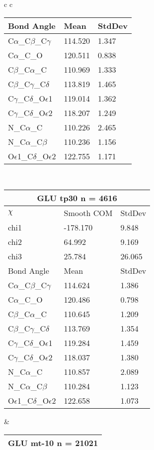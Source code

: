 \begin{longtable}{ c c }
\begin{tabular}{ l l l }
  Bond Angle   & Mean     & StdDev \\ \midrule
  C$\alpha$\_C$\beta$\_C$\gamma$ & 114.520 & 1.347\\
  C$\alpha$\_C\_O & 120.511 & 0.838\\
  C$\beta$\_C$\alpha$\_C & 110.969 & 1.333\\
  C$\beta$\_C$\gamma$\_C$\delta$ & 113.819 & 1.465\\
  C$\gamma$\_C$\delta$\_O$\epsilon$1 & 119.014 & 1.362\\
  C$\gamma$\_C$\delta$\_O$\epsilon$2 & 118.207 & 1.249\\
  N\_C$\alpha$\_C & 110.226 & 2.465\\
  N\_C$\alpha$\_C$\beta$ & 110.236 & 1.156\\
  O$\epsilon$1\_C$\delta$\_O$\epsilon$2 & 122.755 & 1.171\\
  \bottomrule
  \end{tabular}
  \\
  \begin{tabular}{ l l l }
  \toprule
  \multicolumn{3}{c}{GLU \textbf{tp30} n = 4616} \\ \toprule
  $\chi$       & Smooth COM & StdDev \\ \midrule
  chi1 & -178.170 & 9.848 \\ 
  chi2 & 64.992 & 9.169 \\ 
  chi3 & 25.784 & 26.065 \\ \midrule
  Bond Angle   & Mean     & StdDev \\ \midrule
  C$\alpha$\_C$\beta$\_C$\gamma$ & 114.624 & 1.386\\
  C$\alpha$\_C\_O & 120.486 & 0.798\\
  C$\beta$\_C$\alpha$\_C & 110.645 & 1.209\\
  C$\beta$\_C$\gamma$\_C$\delta$ & 113.769 & 1.354\\
  C$\gamma$\_C$\delta$\_O$\epsilon$1 & 119.284 & 1.459\\
  C$\gamma$\_C$\delta$\_O$\epsilon$2 & 118.037 & 1.380\\
  N\_C$\alpha$\_C & 110.857 & 2.089\\
  N\_C$\alpha$\_C$\beta$ & 110.284 & 1.123\\
  O$\epsilon$1\_C$\delta$\_O$\epsilon$2 & 122.658 & 1.073\\
  \bottomrule
  \end{tabular}
  &
  \begin{tabular}{ l l l }
  \toprule
  \multicolumn{3}{c}{GLU \textbf{mt-10} n = 21021} \\ \toprule

\end{tabular}
\end{longtable}
